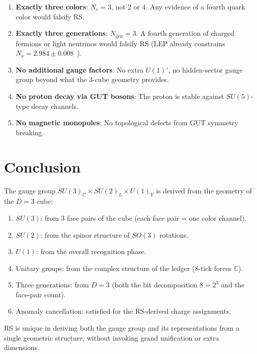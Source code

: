 \documentclass[12pt,a4paper]{article}
\theoremstyle{definition}
\theoremstyle{remark}
\begin{document}
\begin{enumerate}
  \item \textbf{Exactly three colors}: $N_c = 3$, not 2 or 4.
  Any evidence of a fourth quark color would falsify RS.

  \item \textbf{Exactly three generations}: $N_{\mathrm{gen}}
  = 3$.  A fourth generation of charged fermions or light
  neutrinos would falsify RS (LEP already constrains
  $N_\nu = 2.984 \pm 0.008$~\cite{LEP}).

  \item \textbf{No additional gauge factors}: No extra
  $U(1)'$, no hidden-sector gauge group beyond what the 3-cube
  geometry provides.

  \item \textbf{No proton decay via GUT bosons}: The proton
  is stable against $SU(5)$-type decay channels.

  \item \textbf{No magnetic monopoles}: No topological defects
  from GUT symmetry breaking.
\end{enumerate}

\section{Conclusion}
\label{sec:conclusion}

The gauge group $SU(3)_C \times SU(2)_L \times U(1)_Y$ is
derived from the geometry of the $D = 3$ cube:
\begin{enumerate}
  \item $SU(3)$: from 3 face pairs of the cube (each face
  pair = one color channel).
  \item $SU(2)$: from the spinor structure of $SO(3)$
  rotations.
  \item $U(1)$: from the overall recognition phase.
  \item Unitary groups: from the complex structure of the
  ledger (8-tick forces $\mathbb{C}$).
  \item Three generations: from $D = 3$ (both the bit
  decomposition $8 = 2^3$ and the face-pair count).
  \item Anomaly cancellation: satisfied for the RS-derived
  charge assignments.
\end{enumerate}
RS is unique in deriving both the gauge group and its
representations from a single geometric structure, without
invoking grand unification or extra dimensions.
\end{document}
